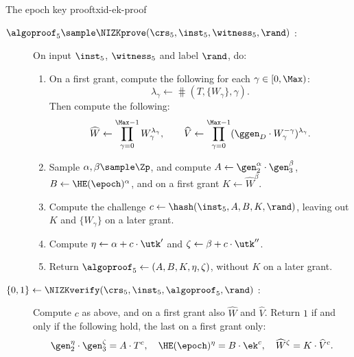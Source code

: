 \begin{protocolbox}{The epoch key proof}{txid-ek-proof}

  \begin{description}

    \item[$\algoproof_5 \sample \NIZKprove(\crs_5, \inst_5, \witness_5,
\rand)$ :] On input $\inst_5$, $\witness_5$ and label $\rand$, do:

      \begin{enumerate}

	\item On a first grant, compute the following for each $\gamma \in
[0,\Max)$:
	  \begin{equation*}
	    \lambda_\gamma \leftarrow \hash(T,\{W_\gamma\},\gamma).
	  \end{equation*}
	  Then compute the following:
	  \begin{equation*}
	    \widehat{W} \leftarrow \prod_{\gamma=0}^{\Max-1}
W_\gamma^{\lambda_\gamma}, \qquad \widehat{V} \leftarrow \prod_{\gamma=0}^{\Max-1}
(\ggen_D\cdot W_\gamma^{-\gamma})^{\lambda_\gamma}.
	  \end{equation*}

	\item Sample $\alpha,\beta \sample \Zp$, and compute $A \leftarrow
\gen_2^{\alpha}\cdot\gen_3^{\beta}$, $B \leftarrow \HE(\epoch)^{\alpha}$, and on
a first grant $K \leftarrow \widehat{W}^{\beta}$.

	\item Compute the challenge $c \leftarrow \hash(\inst_5,A,B,K,\rand)$,
leaving out $K$ and $\{W_\gamma\}$ on a later grant.

	\item Compute $\eta \leftarrow \alpha + c\cdot\utk'$ and $\zeta
\leftarrow \beta + c\cdot\utk''$.

	\item Return $\algoproof_5 \leftarrow (A,B,K,\eta,\zeta)$, without $K$
on a later grant.

      \end{enumerate}

    \item[$\{0,1\} \leftarrow \NIZKverify(\crs_5, \inst_5, \algoproof_5,
\rand)$ :] Compute $c$ as above, and on a first grant also $\widehat{W}$ and
$\widehat{V}$. Return $1$ if and only if the following hold, the last on a
first grant only:
      \begin{equation*}
	\gen_2^{\eta}\cdot\gen_3^{\zeta} = A\cdot T^{c}, \quad
\HE(\epoch)^{\eta} = B\cdot\ek^{c}, \quad \widehat{W}^{\zeta}
= K\cdot\widehat{V}^{c}.
      \end{equation*}

  \end{description}

\end{protocolbox}

